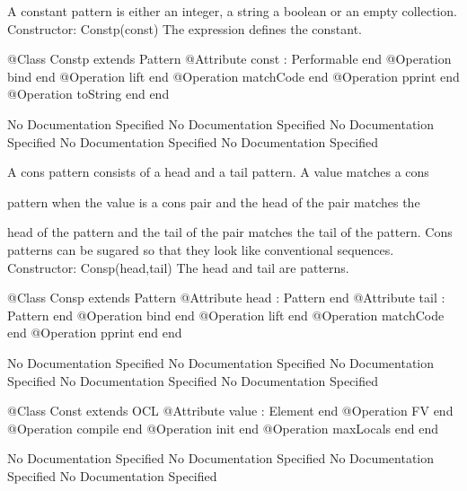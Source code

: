       A constant pattern is either an integer, a string a boolean or an empty collection.
      Constructor: Constp(const)
        The expression defines the constant.
\begin{Interface}
@Class Constp extends Pattern
  @Attribute const : Performable end
  @Operation bind end
  @Operation lift end
  @Operation matchCode end
  @Operation pprint end
  @Operation toString end
end
\end{Interface}
No Documentation Specified
No Documentation Specified
No Documentation Specified
No Documentation Specified
No Documentation Specified

      A cons pattern consists of a head and a tail pattern. A value matches a cons

      pattern when the value is a cons pair and the head of the pair matches the

      head of the pattern and the tail of the pair matches the tail of the pattern.
      Cons patterns can be sugared so that they look like conventional sequences.
      Constructor: Consp(head,tail)
        The head and tail are patterns.
\begin{Interface}
@Class Consp extends Pattern
  @Attribute head : Pattern end
  @Attribute tail : Pattern end
  @Operation bind end
  @Operation lift end
  @Operation matchCode end
  @Operation pprint end
end
\end{Interface}
No Documentation Specified
No Documentation Specified
No Documentation Specified
No Documentation Specified
No Documentation Specified
\begin{Interface}
@Class Const extends OCL
  @Attribute value : Element end
  @Operation FV end
  @Operation compile end
  @Operation init end
  @Operation maxLocals end
end
\end{Interface}
No Documentation Specified
No Documentation Specified
No Documentation Specified
No Documentation Specified

